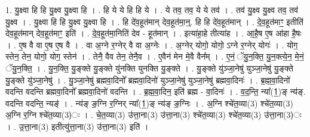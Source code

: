 \documentclass[17pt]{extarticle}
\begin{document}
1. यु॒क्ष्वा हि हि यु॒क्ष्व यु॒क्ष्वा हि । . हि ये ये हि हि ये । . ये तव॒ तव॒ ये ये तव॑ । . तव॑ यु॒क्ष्व यु॒क्ष्व तव॒ तव॑ यु॒क्ष्व । . यु॒क्ष्वा हि हि यु॒क्ष्व यु॒क्ष्वा हि । . हि दे॑व॒हूत॑मान् देव॒हूत॑मा॒न्॒. हि हि दे॑व॒हूत॑मान् । . दे॒व॒हूत॑माꣳ॒॒ इतीति॑ देव॒हूत॑मान् देव॒हूत॑माꣳ॒॒ इति॑ । . दे॒व॒हूत॑मा॒निति॑ देव - हूत॑मान् । . इत्या॑हा॒हे तीत्या॑ह । . आ॒है॒ष ए॒ष आ॑हा है॒षः । . ए॒ष वै वा ए॒ष ए॒ष वै । . वा अ॒ग्ने र॒ग्नेर् वै वा अ॒ग्नेः । . अ॒ग्नेर् योगो॒ योगो॒ ऽग्ने र॒ग्नेर् योगः॑ । . योग॒ स्तेन॒ तेन॒ योगो॒ योग॒ स्तेन॑ । . तेनै॒ वैव तेन॒ तेनै॒व । . ए॒वैन॑ मेन मे॒वै वैन᳚म् । . ए॒नं॒ ॅयु॒न॒क्ति॒ यु॒न॒क्त्ये॒न॒ मे॒नं॒ ॅयु॒न॒क्ति॒ । . यु॒न॒क्ति॒ यु॒ङ्क्ते यु॒ङ्क्ते यु॑नक्ति युनक्ति यु॒ङ्क्ते । . यु॒ङ्क्ते यु॑ञ्जा॒नेषु॑ युञ्जा॒नेषु॑ यु॒ङ्क्ते यु॒ङ्क्ते यु॑ञ्जा॒नेषु॑ । . यु॒ञ्जा॒नेषु॑ ब्रह्मवा॒दिनो᳚ ब्रह्मवा॒दिनो॑ युञ्जा॒नेषु॑ युञ्जा॒नेषु॑ ब्रह्मवा॒दिनः॑ । . ब्र॒ह्म॒वा॒दिनो॑ वदन्ति वदन्ति ब्रह्मवा॒दिनो᳚ ब्रह्मवा॒दिनो॑ वदन्ति । . ब्र॒ह्म॒वा॒दिन॒ इति॑ ब्रह्म - वा॒दिनः॑ । . व॒द॒न्ति॒ न्या᳚(1॒)ङ् न्य॑ङ्. वदन्ति वदन्ति॒ न्यङ्॑ । . न्य॑ङ् ङ॒ग्नि र॒ग्निर् न्या᳚(1॒)ङ् न्य॑ङ् ङ॒ग्निः । . अ॒ग्नि श्चे॑त॒व्या(3) श्चे॑त॒व्या(3) अ॒ग्नि र॒ग्नि श्चे॑त॒व्या(3)ः । . चे॒त॒व्या(3) उ॑त्ता॒ना(3) उ॑त्ता॒ना(3) श्चे॑त॒व्या(3) श्चे॑त॒व्या(3) उ॑त्ता॒ना(3)ः । . उ॒त्ता॒ना(3) इतीत्यु॑त्ता॒ना(3) उ॑त्ता॒ना(3) इति॑ । \newline
\end{document}
